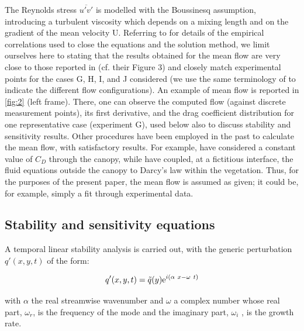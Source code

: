 The Reynolds stress $\overline{u'v'}$ is modelled with
the Boussinesq assumption, introducing a turbulent viscosity which depends on a mixing length and
on the gradient of the mean velocity U. Referring to \citet{ghisalberti2004limited} for details of the empirical
correlations used to close the equations and the solution method, we limit ourselves here to stating
that the results obtained for the mean flow are very close to those reported in \citet{zampogna2016instability} (cf.
their Figure 3) and closely match experimental points for the cases G, H, I, and J considered (we use
the same terminology of \citet{ghisalberti2002mixing} \cite{ghisalberti2004limited} \cite{ghisalberti2005mass} to indicate the different flow configurations). An
example of mean flow is reported in \ref{fig:2} (left frame). There, one can observe the computed flow
(against discrete measurement points), its first derivative, and the drag coefficient distribution for one
representative case (experiment G), used below also to discuss stability and sensitivity results.
Other procedures have been employed in the past to calculate the mean flow, with satisfactory
results. For example, \citet{singh2016linear} have considered a constant value of $C_D$ through the canopy, while
\citet{zampogna2016instability} have coupled, at a fictitious interface, the fluid equations outside the canopy
to Darcy’s law within the vegetation. Thus, for the purposes of the present paper, the mean flow is
assumed as given; it could be, for example, simply a fit through experimental data. 


\subsection{Stability and sensitivity equations}
\label{sec2b}
A temporal linear stability analysis is carried out, with the generic perturbation $q'(x, y,t)$ of the
form:

\begin{equation}
q'(x,y,t)=\tilde q(y){\rm e}^{i(\alpha \  x -\omega \ t)}
\label{eq:q}
\end{equation}

with $\alpha$ the real streamwise wavenumber and $\omega$ a complex number whose real part, $\omega_r$, is the frequency of the mode and the imaginary part, $\omega_i$ , is the growth rate. 

